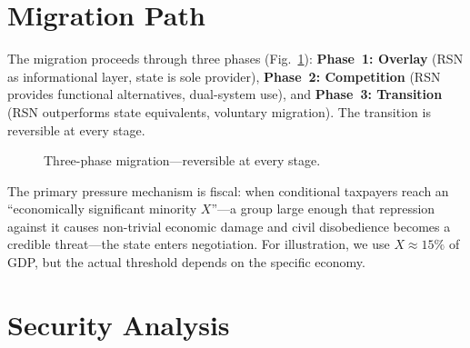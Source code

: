 \documentclass[11pt,a4paper,twocolumn]{article}
\begin{document}
\section{Migration Path}

The migration proceeds through three phases (Fig.~\ref{fig:migration}): \textbf{Phase~1: Overlay} (RSN as informational layer, state is sole provider), \textbf{Phase~2: Competition} (RSN provides functional alternatives, dual-system use), and \textbf{Phase~3: Transition} (RSN outperforms state equivalents, voluntary migration). The transition is reversible at every stage.

\begin{figure}[ht]
\centering
{}
\caption{Three-phase migration---reversible at every stage.}
\label{fig:migration}
\end{figure}

The primary pressure mechanism is fiscal: when conditional taxpayers reach an ``economically significant minority $X$''---a group large enough that repression against it causes non-trivial economic damage and civil disobedience becomes a credible threat---the state enters negotiation. For illustration, we use $X \approx 15\%$ of GDP, but the actual threshold depends on the specific economy.

\section{Security Analysis}
\end{document}
